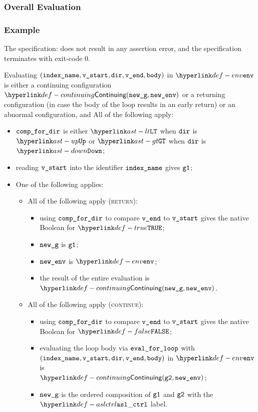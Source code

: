 \subsubsection{Overall Evaluation}
\subsubsection{Example}
The specification:
does not result in any assertion error, and the specification terminates with exit-code $0$.

Evaluating $(\texttt{index\_name}, \texttt{v\_start}, \texttt{dir}, \texttt{v\_end}, \texttt{body})$ in $\env$ is either
a continuing configuration $\Continuing(\newg, \newenv)$ or a returning configuration
(in case the body of the loop results in an early return)
or an abnormal configuration,
and All of the following apply:
\begin{itemize}
  \item $\texttt{comp\_for\_dir}$ is either $\LT$ when $\texttt{dir}$ is $\UP$ or $\GT$ when $\texttt{dir}$ is $\DOWN$;
  \item reading $\texttt{v\_start}$ into the identifier $\texttt{index\_name}$ gives $\texttt{g1}$;
  \item One of the following applies:
    \begin{itemize}
    \item All of the following apply (\textsc{return}):
    \begin{itemize}
      \item using $\texttt{comp\_for\_dir}$ to compare $\texttt{v\_end}$ to $\texttt{v\_start}$ gives the native Boolean for $\True$;
      \item $\texttt{new\_g}$ is $\texttt{g1}$;
      \item $\texttt{new\_env}$ is $\env$;
      \item the result of the entire evaluation is $\Continuing(\newg, \newenv)$.
    \end{itemize}
    \item All of the following apply (\textsc{continue}):
    \begin{itemize}
      \item using $\texttt{comp\_for\_dir}$ to compare $\texttt{v\_end}$ to $\texttt{v\_start}$ gives the native Boolean for $\False$;
      \item evaluating the loop body via $\texttt{eval\_for\_loop}$ with \\ $(\texttt{index\_name}, \texttt{v\_start}, \texttt{dir}, \texttt{v\_end}, \texttt{body})$
      in $\env$ is \\ $\Continuing(\vgtwo, \newenv)$\ProseTerminateAs{\ReturningConfig, \ThrowingConfig, \ErrorConfig};
      \item $\texttt{new\_g}$ is the ordered composition of $\texttt{g1}$ and $\texttt{g2}$ with the $\aslctrl$ label.
    \end{itemize}
  \end{itemize}
\end{itemize}

